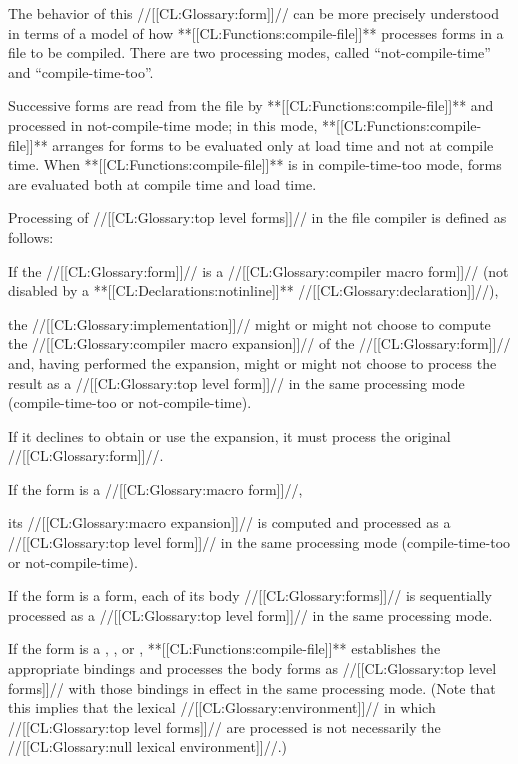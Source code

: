 The behavior of this //[[CL:Glossary:form]]// can be more precisely understood in
terms of a model of how **[[CL:Functions:compile-file]]** processes forms in
a file to be compiled. There are two processing modes, called
``not-compile-time'' and ``compile-time-too''.
 
Successive forms are read from the file by **[[CL:Functions:compile-file]]**
and processed in not-compile-time mode; in this mode, 
**[[CL:Functions:compile-file]]** arranges for forms to be evaluated only at load time
and not at compile time.  When **[[CL:Functions:compile-file]]** is in
compile-time-too mode, forms are evaluated both at compile time and
load time.


Processing of //[[CL:Glossary:top level forms]]// in the file compiler is defined
as follows:

\beginlist
{}
  If the //[[CL:Glossary:form]]// is a //[[CL:Glossary:compiler macro form]]//
(not disabled by a **[[CL:Declarations:notinline]]** //[[CL:Glossary:declaration]]//),


the //[[CL:Glossary:implementation]]// might or might not choose to compute
the //[[CL:Glossary:compiler macro expansion]]// of the //[[CL:Glossary:form]]// and,
having performed the expansion, might or might not choose to process the result
as a //[[CL:Glossary:top level form]]// in the same processing mode
(compile-time-too or not-compile-time).

If it declines to obtain or use the expansion, it must process the original //[[CL:Glossary:form]]//.

 
  If the form is a //[[CL:Glossary:macro form]]//,






its //[[CL:Glossary:macro expansion]]// is computed and processed as a 
//[[CL:Glossary:top level form]]// in
the same processing mode (compile-time-too or not-compile-time).
 
  If the form is a  form, each of its
body //[[CL:Glossary:forms]]// is sequentially processed as a 
//[[CL:Glossary:top level form]]// in the same processing mode.
 
  If the form is a , 
, or , 
**[[CL:Functions:compile-file]]** establishes the appropriate bindings and processes the
body forms as //[[CL:Glossary:top level forms]]// with those bindings in effect
in the same processing mode.  (Note that this implies that the lexical
//[[CL:Glossary:environment]]// in which //[[CL:Glossary:top level forms]]// are processed
is not necessarily the //[[CL:Glossary:null lexical environment]]//.)
 
